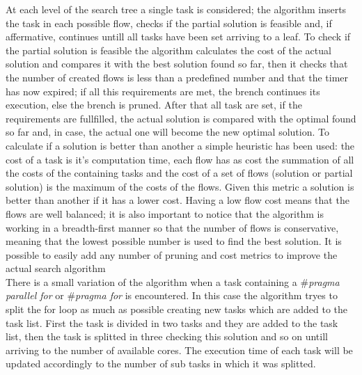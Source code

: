 \documentclass[a4paper,11pt,oneside]{book}
\begin{document}
At each level of the search tree a single task is considered; the algorithm inserts the task in each possible flow, checks if the partial solution is feasible and, if affermative, continues untill all tasks have been set arriving to a leaf. To check if the partial solution is feasible the algorithm calculates the cost of the actual solution and compares it with the best solution found so far, then it checks that the number of created flows is less than a predefined number and that the timer has now expired; if all this requirements are met, the brench continues its execution, else the brench is pruned. After that all task are set, if the requirements are fullfilled, the actual solution is compared with the optimal found so far and, in case, the actual one will become the new optimal solution. To calculate if a solution is better than another a simple heuristic has been used: the cost of a task is it's computation time, each flow has as cost the summation of all the costs of the containing tasks and the cost of a set of flows (solution or partial solution) is the maximum of the costs of the flows. Given this metric a solution is better than another if it has a lower cost. Having a low flow cost means that the flows are well balanced; it is also important to notice that the algorithm is working in a \emph{}breadth-first manner so that the number of flows is conservative, meaning that the lowest possible number is used to find the best solution. It is possible to easily add any number of pruning and cost metrics to improve the actual search algorithm\\
There is a small variation of the algorithm when a task containing a \emph{$\#$pragma parallel for} or \emph{$\#$pragma  for} is encountered. In this case the algorithm tryes to split the for loop as much as possible creating new tasks which are added to the task list. First the task is divided in two tasks and they are added to the task list, then the task is splitted in three checking this solution and so on untill arriving to the number of available cores. The execution time of each task will be updated accordingly to the number of sub tasks in which it was splitted. \\
\end{document}
